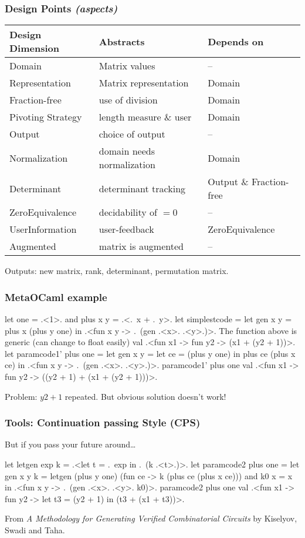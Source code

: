 \documentclass{beamer}
\begin{document}
\begin{frame}
\frametitle{Design Points \emph{(aspects)}}
\begin{tabular}{@{}l|l|l@{}} \hline
	Design Dimension & Abstracts & Depends on \\ \hline
    Domain & Matrix values & -- \\ \hline
    Representation & Matrix representation & Domain \\ \hline
	Fraction-free & use of division & Domain \\ \hline
	Pivoting Strategy & length measure \& user & Domain \\ \hline
	Output & choice of output & -- \\ \hline
	Normalization & domain needs normalization & Domain \\ \hline
	Determinant & determinant tracking & Output \& Fraction-free \\ \hline
	ZeroEquivalence & decidability of $=0$ & -- \\ \hline
	UserInformation & user-feedback & ZeroEquivalence\\ \hline
	Augmented & matrix is augmented & -- \\ \hline
\end{tabular}

\vspace{5mm}
Outputs: new matrix, rank, determinant, permutation matrix.
\end{frame}

\begin{frame}[fragile]
\frametitle{MetaOCaml example}
\begin{code}
let one = .<1>. and plus x y = .<.~x + .~y>.
let simplestcode = let gen x y = plus x (plus y one) in
  .<fun x y -> .~(gen .<x>. .<y>.)>.
The function above is generic (can change to float easily)
 val .<fun x1 -> fun y2 -> (x1 + (y2 + 1))>.
let paramcode1' plus one =
  let gen x y = let ce = (plus y one) in  plus ce (plus x ce) in
  .<fun x y -> .~(gen .<x>. .<y>.)>.
paramcode1' plus one
 val .<fun x1 -> fun y2 -> ((y2 + 1) + (x1 + (y2 + 1)))>.
\end{code}
Problem: $y2+1$ repeated.  But obvious solution doesn't work!
\end{frame}

\begin{frame}[fragile]
    \frametitle{Tools: Continuation passing Style (CPS)}
    But if you pass your future around\dots
\begin{code}
let letgen exp k = .<let t = .~exp in .~(k .<t>.)>.
let paramcode2 plus one =
  let gen x y k = letgen (plus y one) 
                  (fun ce -> k (plus ce (plus x ce)))
  and k0 x = x
  in .<fun x y -> .~(gen .<x>. .<y>. k0)>.
paramcode2 plus one
val .<fun x1 -> fun y2 -> 
           let t3 = (y2 + 1) in (t3 + (x1 + t3))>.
\end{code}
From \textit{A Methodology for Generating Verified Combinatorial Circuits} by 
Kiselyov, Swadi and Taha.
\end{frame}
\end{document}
